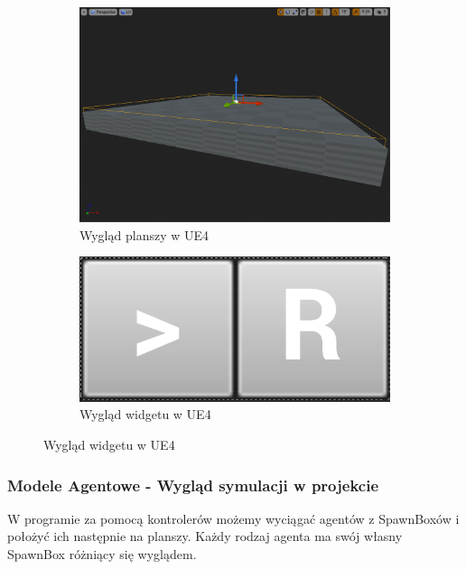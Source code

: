 \documentclass[a4paper,12pt,reqno]{article}
\begin{document}
\begin{figure}[!ht]%
	\centering
	\begin{subfigure}{.5\textwidth}
		\centering
		\includegraphics[width=0.9\linewidth]{graphics//agent/BP_AgentTable.png}
		\caption{Wygląd planszy w UE4}	
		\label{ref:subref_a}
	\end{subfigure}%
	\begin{subfigure}{.5\textwidth}
		\centering
		\includegraphics[width=0.9\linewidth]{graphics//agent/BP_AgentControl.png}
		\caption{Wygląd widgetu w UE4}
		\label{ref:subref_b}
	\end{subfigure}%
\label{ref:ref}
\end{figure}

\subsubsection{Modele Agentowe - Wygląd symulacji w projekcie}
W programie za pomocą kontrolerów możemy wyciągać agentów z SpawnBoxów i położyć ich następnie na planszy. Każdy rodzaj agenta ma swój własny SpawnBox różniący się wyglądem.
\end{document}
